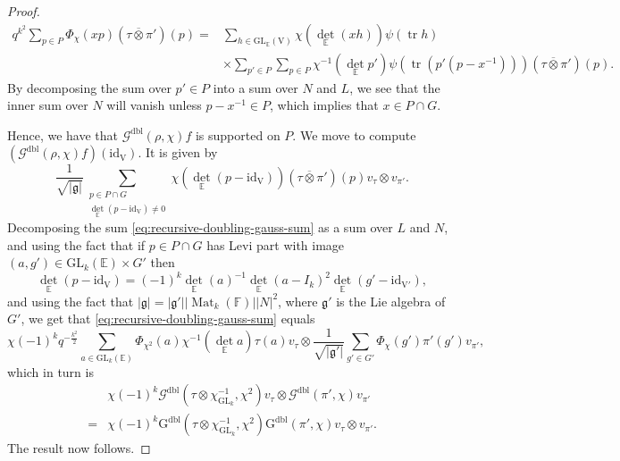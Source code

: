 \documentclass[12pt, reqno]{amsart}
\theoremstyle{definition}
\theoremstyle{definition}
\theoremstyle{definition}
\newcommand{\detQuadratic}{{\det}_{\quadraticExtension}}
\newcommand{\idmap}{\mathrm{id}}
\newcommand{\sizeof}[1]{\left|#1\right|}
\newcommand{\hermitianSpace}{\mathrm{V}}
\newcommand{\fieldCharacter}{\psi}
\newcommand{\trace}{\operatorname{tr}}
\newcommand{\GL}{\mathrm{GL}}
\newcommand{\finiteField}{\mathbb{F}}
\newcommand{\quadraticExtension}{\mathbb{E}}
\newcommand{\squareMatrix}{\operatorname{Mat}}
\newcommand{\dblGaussSum}[2]{\mathcal{G}^{\mathrm{dbl}}\left(#1, #2\right)}
\newcommand{\dblGaussSumScalar}[2]{\mathrm{G}^{\mathrm{dbl}}\left(#1, #2\right)}
\newcommand{\lieAlgebra}{\mathfrak{g}}
\begin{document}
\begin{proof}
\begin{align*}
		q^{k^2} \sum_{p \in P} \Phi_{\chi}\left(xp\right) \left(\tau \overline{\otimes} \pi'\right)\left(p\right) =& \sum_{h \in \GL_{\quadraticExtension}\left(\hermitianSpace\right)}  \chi\left(\detQuadratic\left(xh\right)\right) \fieldCharacter\left(\trace h\right) \\
		& \times \sum_{p' \in P} \sum_{p \in P} \chi^{-1}\left(\detQuadratic p'\right) \fieldCharacter\left(\trace\left(p' \left(p - x^{-1}\right)\right)\right) \left(\tau \overline{\otimes} \pi'\right)\left(p\right).
	\end{align*}
	By decomposing the sum over $p' \in P$ into a sum over $N$ and $L$, we see that the inner sum over $N$ will vanish unless $p - x^{-1} \in P$, which implies that $x \in P \cap G$.
	
	Hence, we have that $\dblGaussSum{\rho}{\chi} f$ is supported on $P$. We move to compute $\left(\dblGaussSum{\rho}{\chi} f\right)\left(\idmap_{\hermitianSpace}\right)$. It is given by
	\begin{equation}\label{eq:recursive-doubling-gauss-sum}
		\frac{1}{\sqrt{\sizeof{\lieAlgebra}}} \sum_{\substack{p \in P \cap G\\
				\detQuadratic\left(p - \idmap_{\hermitianSpace}\right) \ne 0}} \chi\left(\detQuadratic\left(p - \idmap_{\hermitianSpace}\right)\right) \left(\tau \overline{\otimes} \pi'\right)\left(p\right) v_{\tau} \otimes v_{\pi'}.
	\end{equation}
	Decomposing the sum \eqref{eq:recursive-doubling-gauss-sum} as a sum over $L$ and $N$, and using the fact that if $p \in P \cap G$ has Levi part with image $\left(a, g'\right) \in \GL_k\left(\quadraticExtension\right) \times G'$ then $$\detQuadratic\left(p - \idmap_{\hermitianSpace}\right) = \left(-1\right)^k \detQuadratic\left(a\right)^{-1}\detQuadratic\left(a - I_k\right)^2 \detQuadratic\left( g' - \idmap_{\hermitianSpace'}\right),$$
	and using the fact that $\sizeof{\lieAlgebra} = \sizeof{\lieAlgebra'} \sizeof{\squareMatrix_k\left(\finiteField\right)} \sizeof{N}^2$, where $\lieAlgebra'$ is the Lie algebra of $G'$,
	we get that \eqref{eq:recursive-doubling-gauss-sum} equals
	\begin{equation}
		\chi\left(-1\right)^k q^{-\frac{k^2}{2}} \sum_{a \in \GL_k\left(\quadraticExtension\right)} \Phi_{\chi^2}\left(a\right) \chi^{-1}\left(\detQuadratic a\right) \tau\left(a\right) v_{\tau} \otimes \frac{1}{\sqrt{\sizeof{\lieAlgebra'}}} \sum_{g' \in G'} \Phi_{\chi}\left(g'\right) \pi'\left(g'\right) v_{\pi'},
	\end{equation}
	which in turn is
	\begin{align*}
		&\chi\left(-1\right)^k \dblGaussSum{\tau \otimes \chi_{\GL_k}^{-1}}{\chi^2} v_{\tau} \otimes \dblGaussSum{\pi'}{\chi} v_{\pi'}\\
		=& \chi\left(-1\right)^k\dblGaussSumScalar{\tau \otimes \chi_{\GL_k}^{-1}}{\chi^2} \dblGaussSumScalar{\pi'}{\chi} v_{\tau} \otimes v_{\pi'}.
	\end{align*}
	The result now follows.
\end{proof}
\end{document}
